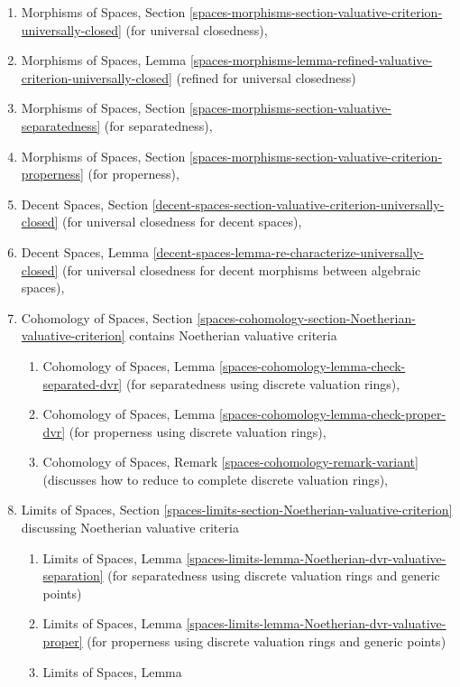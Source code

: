 \begin{enumerate}
\item Morphisms of Spaces, Section
\ref{spaces-morphisms-section-valuative-criterion-universally-closed}
(for universal closedness),
\item Morphisms of Spaces, Lemma
\ref{spaces-morphisms-lemma-refined-valuative-criterion-universally-closed}
(refined for universal closedness)
\item Morphisms of Spaces, Section
\ref{spaces-morphisms-section-valuative-separatedness}
(for separatedness),
\item Morphisms of Spaces, Section
\ref{spaces-morphisms-section-valuative-criterion-properness}
(for properness),
\item Decent Spaces, Section
\ref{decent-spaces-section-valuative-criterion-universally-closed}
(for universal closedness for decent spaces),
\item Decent Spaces, Lemma
\ref{decent-spaces-lemma-re-characterize-universally-closed}
(for universal closedness for decent morphisms between algebraic spaces),
\item Cohomology of Spaces, Section
\ref{spaces-cohomology-section-Noetherian-valuative-criterion}
contains Noetherian valuative criteria
\begin{enumerate}
\item Cohomology of Spaces, Lemma
\ref{spaces-cohomology-lemma-check-separated-dvr}
(for separatedness using discrete valuation rings),
\item Cohomology of Spaces, Lemma
\ref{spaces-cohomology-lemma-check-proper-dvr}
(for properness using discrete valuation rings),
\item Cohomology of Spaces, Remark
\ref{spaces-cohomology-remark-variant}
(discusses how to reduce to complete discrete valuation rings),
\end{enumerate}
\item Limits of Spaces, Section
\ref{spaces-limits-section-Noetherian-valuative-criterion}
discussing Noetherian valuative criteria
\begin{enumerate}
\item Limits of Spaces, Lemma
\ref{spaces-limits-lemma-Noetherian-dvr-valuative-separation}
(for separatedness using discrete valuation rings and generic points)
\item Limits of Spaces, Lemma
\ref{spaces-limits-lemma-Noetherian-dvr-valuative-proper}
(for properness using discrete valuation rings and generic points)
\item Limits of Spaces, Lemma

\end{enumerate}
\end{enumerate}
